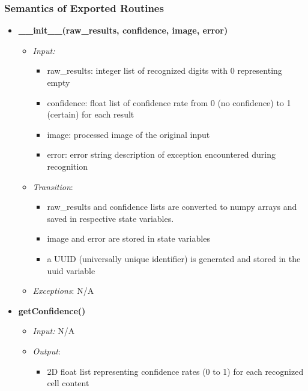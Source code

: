 \documentclass[11pt]{article}
\begin{document}
		\subsubsection{Semantics of Exported Routines}
		\begin{itemize}
		    \item \textbf{\_\_init\_\_(raw\_results, confidence, image, error)}
		\begin{itemize}
		    \item[] \textit{Input: }
			\begin{itemize}
		        \item raw\_results: integer list of recognized digits with 0 representing empty
		        \item confidence: float list of confidence rate from 0 (no confidence) to 1 (certain) for each result
		        \item image: processed image of the original input
		        \item error: error string description of exception encountered during recognition
		    \end{itemize}	    
		    
		    \item[] \textit{Transition}: 
		    \begin{itemize}
		        \item raw\_results and confidence lists are converted to numpy arrays and saved in respective state variables.
		        \item image and error are stored in state variables
		        \item a UUID (universally unique identifier) is generated and stored in the uuid variable
		    \end{itemize}
		    
		    \item[] \textit{Exceptions}:
		    N/A
		\end{itemize}
		
		
		\item \textbf{getConfidence()}
		\begin{itemize}
		    \item[] \textit{Input: } N/A
		    
		    \item[] \textit{Output}: 
		    \begin{itemize}
		        \item 2D float list representing confidence rates (0 to 1) for each recognized cell content
		    \end{itemize}
		    

\end{itemize}
\end{itemize}
\end{document}
